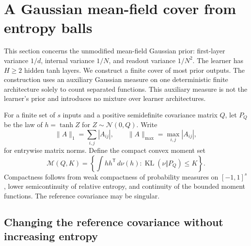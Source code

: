 \section{A Gaussian mean-field cover from entropy balls}
\label{sec:mf-entropy-cover}

This section concerns the unmodified mean-field Gaussian prior:
first-layer variance $1/d$, internal variance $1/N$, and readout
variance $1/N^2$.  The learner has $H\geq2$ hidden tanh layers.
We construct a finite cover of most prior outputs.  The construction
uses an auxiliary Gaussian measure on one deterministic finite
architecture solely to count separated functions.  This auxiliary
measure is not the learner's prior and introduces no mixture over
learner architectures.

For a finite set of $s$ inputs and a positive semidefinite covariance
matrix $Q$, let $P_Q$ be the law of $h=\tanh Z$ for
$Z\sim\mathcal N(0,Q)$.  Write
\[
 \|A\|_1=\sum_{i,j}|A_{ij}|,\qquad
 \|A\|_{\max}=\max_{i,j}|A_{ij}|,
\]
for entrywise matrix norms.  Define the compact convex moment set
\begin{equation}
 \mathcal M(Q,K)=
 \left\{\int hh^{\mathsf T}\,d\nu(h):
        \operatorname{KL}(\nu\Vert P_Q)\leq K\right\}.
 \label{eq:mf-entropy-moment-set}
\end{equation}
Compactness follows from weak compactness of probability measures on
$[-1,1]^s$, lower semicontinuity of relative entropy, and continuity of
the bounded moment functions.  The reference covariance may be singular.

\subsection{Changing the reference covariance without increasing entropy}

